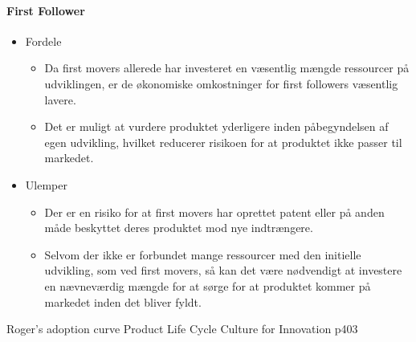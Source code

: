 \paragraph{First Follower}
\begin{itemize}
    \item Fordele
    \begin{itemize}
        \item Da first movers allerede har investeret en væsentlig mængde ressourcer på udviklingen, er de økonomiske omkostninger for first followers væsentlig lavere.
        \item Det er muligt at vurdere produktet yderligere inden påbegyndelsen af egen udvikling, hvilket reducerer risikoen for at produktet ikke passer til markedet.
    \end{itemize}
    \item Ulemper
    \begin{itemize}
        \item Der er en risiko for at first movers har oprettet patent eller på anden måde beskyttet deres produktet mod nye indtrængere.
        \item Selvom der ikke er forbundet mange ressourcer med den initielle udvikling, som ved first movers, så kan det være nødvendigt at investere en nævneværdig mængde for at sørge for at produktet kommer på markedet inden det bliver fyldt.
    \end{itemize}
\end{itemize}

Roger's adoption curve
Product Life Cycle
Culture for Innovation p403